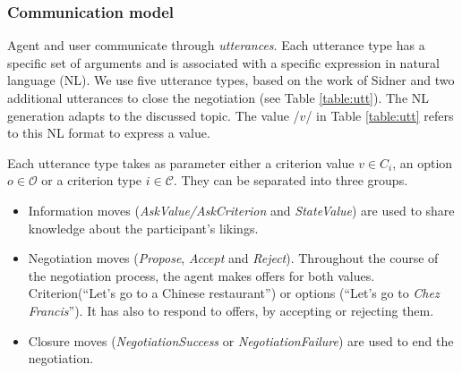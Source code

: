 \documentclass[runningheads,a4paper]{llncs}
\begin{document}
	\subsubsection{Communication model}
	\label{Comm}
	Agent and user communicate through \emph{utterances}. Each utterance type has a specific set of arguments and is associated with a specific expression in natural language (NL). We use five utterance types, based on the work of Sidner \cite{sidner1994artificial} and two additional utterances to close the negotiation (see Table \ref{table:utt}). The NL generation adapts to the discussed topic. The value /$v$/ in Table \ref{table:utt} refers to this NL format to express a value.
	
	
	Each utterance type takes as parameter either a criterion value $v \in C_i$, an option $o \in \mathcal{O}$ or a criterion type $i \in \mathcal{C}$. They can be separated into three groups. 
	
	\begin{itemize}
		\item Information moves (\textit{AskValue/AskCriterion} and \textit{StateValue}) are used to share knowledge about the participant's likings.
		\item Negotiation moves (\textit{Propose}, \textit{Accept} and \textit{Reject}). Throughout the course of the negotiation process, the agent makes offers for both values. Criterion(``Let's go to a Chinese restaurant'') or options (``Let's go to \emph{Chez Francis}''). It has also to respond to offers, by accepting or rejecting them.
		
		\item Closure moves (\textit{NegotiationSuccess} or \textit{NegotiationFailure}) are used to end the negotiation.
	\end{itemize}
	
	
	
\end{document}
